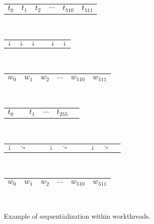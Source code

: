 \begin{figure}
  \centering
  \begin{minipage}{0.45\textwidth}
    \centering
      \begin{tabular}{C{0.6cm}C{0.6cm}C{0.6cm}C{0.6cm}C{0.6cm}C{0.6cm}}
        $t_0$ & $t_1$ & $t_2$ & $\cdots$ & $t_{510}$ & $t_{511}$\\
      \end{tabular}\\[-0.5ex]
      \begin{tabular}{C{0.6cm}C{0.6cm}C{0.6cm}C{0.6cm}C{0.6cm}C{0.6cm}}
        $\shortdownarrow$ & $\shortdownarrow$ & $\shortdownarrow$ & & $\shortdownarrow$ & $\shortdownarrow$\\
      \end{tabular}\\[-0.5ex]
      \begin{tabular}{|C{0.6cm}|C{0.6cm}|C{0.6cm}|C{0.6cm}|C{0.6cm}|C{0.6cm}|}
        \hline
        $w_0$ & $w_1$ & $w_2$ & $\cdots$ & $w_{510}$ & $w_{511}$\\
        \hline
      \end{tabular}\\
    \end{minipage}
    \begin{minipage}{0.45\textwidth}
      \centering
      \begin{tabular}{C{0.6cm}C{0.6cm}C{0.6cm}C{0.6cm}C{0.6cm}C{0.6cm}}
        $t_0$ &  & $t_1$ & $\cdots$ & $t_{255}$ & \\
      \end{tabular}\\[-0.5ex]
      \begin{tabular}{C{0.105cm}C{0.105cm}C{0.105cm}C{0.105cm}C{0.105cm}C{0.105cm}C{0.105cm}C{0.105cm}C{0.105cm}C{0.105cm}C{0.105cm}}
        $\shortdownarrow$ & $\diagonalarrowdown$ &  &  & $\shortdownarrow$ & $\diagonalarrowdown$ &  &  & $\shortdownarrow$ & $\diagonalarrowdown$ & \\
      \end{tabular}\\[-0.5ex]
      \begin{tabular}{|C{0.6cm}|C{0.6cm}|C{0.6cm}|C{0.6cm}|C{0.6cm}|C{0.6cm}|}
        \hline
        $w_0$ & $w_1$ & $w_2$ & $\cdots$ & $w_{510}$ & $w_{511}$\\
        \hline
      \end{tabular}\\
    \end{minipage}
    \caption{Example of sequentialization within workthreads.}
    \label{fig:seqexa}
\end{figure}

